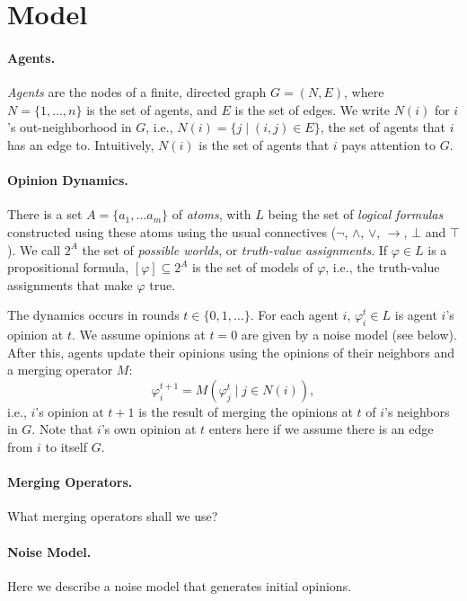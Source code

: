 \documentclass{scrartcl}
\theoremstyle{definition}
\renewcommand{\phi}{\varphi}
\newcommand{\merge}{M}
\begin{document}
\section{Model}\label{sec:model}


\paragraph{Agents.}
\emph{Agents} are the nodes of a finite, directed graph $G = (N, E)$, 
where $N = \{1, \dots, n\}$ is the set of agents, and $E$ is the set of edges.   
We write $N(i)$ for $i$'s out-neighborhood in $G$, 
i.e., $N(i) = \{j \mid (i, j) \in E\}$, the set of agents that $i$ has an edge to.
Intuitively, $N(i)$ is the set of agents that $i$ pays attention to $G$.  

\paragraph{Opinion Dynamics.}
There is a set $A = \{a_1, \dots a_m\}$ of \emph{atoms},
with $L$ being the set of \emph{logical formulas} constructed using these atoms
using the usual connectives ($\lnot$, $\land$, $\lor$, $\rightarrow$, $\bot$ and $\top$).
We call $2^A$ the set of \emph{possible worlds}, or \emph{truth-value assignments}.
If $\phi \in L$ is a propositional formula, $[\phi] \subseteq 2^A$ is the set of models of $\phi$,
i.e., the truth-value assignments that make $\phi$ true.

The dynamics occurs in rounds $t \in \{0, 1, \dots\}$.
For each agent $i$, $\phi_i^t \in L$ is agent $i$'s opinion at $t$.
We assume opinions at $t=0$ are given by a noise model (see below). 
After this, agents update their opinions using the opinions of their neighbors 
and a merging operator $M$:
$$
    \phi_i^{t+1} = \merge {\left(\phi_j^t \mid j \in N(i)\right)},
$$
i.e., $i$'s opinion at $t+1$ is the result of merging 
the opinions at $t$ of $i$'s neighbors in $G$.
Note that $i$'s own opinion at $t$ enters here if we assume there is an edge from $i$ to itself $G$.     

\paragraph{Merging Operators.}
What merging operators shall we use?

\paragraph{Noise Model.}
Here we describe a noise model that generates initial opinions. 
\end{document}
